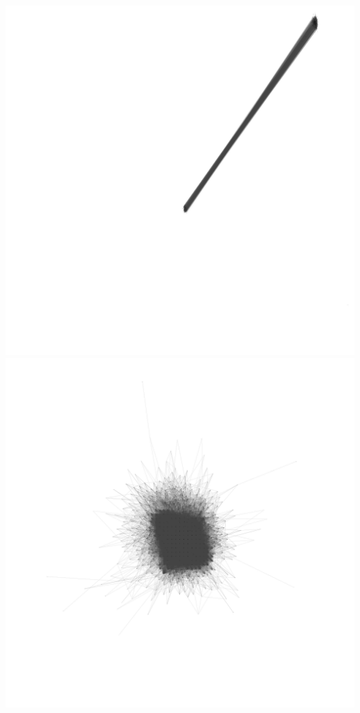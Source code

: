 \documentclass[12pt, a4paper]{article}
\begin{document}
\begin{multicols}{2}
  {\centering
  \includegraphics[width=\columnwidth]{src/youtube/hdg/comp/5_plot_drl}\\
  \label{fig:hdg_c5}}
  {\centering
  \includegraphics[width=\columnwidth]{src/youtube/hdg/comp/6_plot_ghopt}\\
  \label{fig:hdg_c6}}
\end{multicols}
\end{document}
